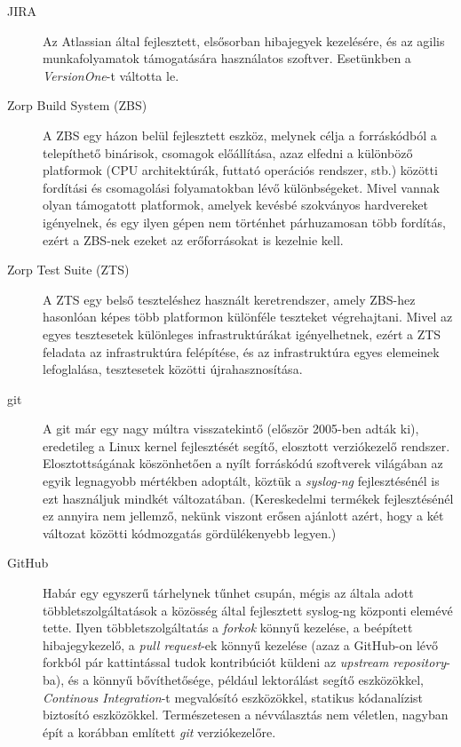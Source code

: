 \begin{description}
    \item[JIRA] {Az Atlassian által fejlesztett, elsősorban hibajegyek kezelésére, és az agilis
        munkafolyamatok támogatására használatos szoftver. Esetünkben a \emph{VersionOne}-t váltotta
        le.}
    \item[Zorp Build System (ZBS)] {A ZBS egy házon belül fejlesztett eszköz, melynek célja
        a forráskódból a telepíthető binárisok, csomagok előállítása, azaz elfedni a különböző
        platformok (CPU architektúrák, futtató operációs rendszer, stb.) közötti fordítási és
        csomagolási folyamatokban lévő különbségeket. Mivel vannak olyan támogatott platformok, amelyek
        kevésbé szokványos hardvereket igényelnek, és egy ilyen gépen nem történhet párhuzamosan több
        fordítás, ezért a ZBS-nek ezeket az erőforrásokat is kezelnie kell. }
    \item[Zorp Test Suite (ZTS)] { A ZTS egy belső teszteléshez használt keretrendszer, amely
        ZBS-hez hasonlóan képes több platformon különféle teszteket végrehajtani. Mivel az egyes
        tesztesetek különleges infrastruktúrákat igényelhetnek, ezért a ZTS feladata az
        infrastruktúra felépítése, és az infrastruktúra egyes elemeinek lefoglalása, tesztesetek
        közötti újrahasznosítása.}
    \item[git] {A git már egy nagy múltra visszatekintő (először 2005-ben adták ki), eredetileg a
        Linux kernel fejlesztését segítő, elosztott verziókezelő rendszer. Elosztottságának
        köszönhetően a nyílt forráskódú szoftverek világában az egyik legnagyobb mértékben
        adoptált, köztük a \emph{syslog-ng} fejlesztésénél is ezt használjuk mindkét változatában.
        (Kereskedelmi termékek fejlesztésénél ez annyira nem jellemző, nekünk viszont erősen
        ajánlott azért, hogy a két változat közötti kódmozgatás gördülékenyebb legyen.)}
    \item[GitHub] {Habár egy egyszerű tárhelynek tűnhet csupán, mégis az általa adott
        többletszolgáltatások a közösség által fejlesztett syslog-ng központi elemévé tette.
        Ilyen többletszolgáltatás a \emph{forkok} könnyű kezelése, a beépített hibajegykezelő,
        a \emph{pull request}-ek könnyű kezelése (azaz a GitHub-on lévő forkból pár
        kattintással tudok kontribúciót küldeni az \emph{upstream repository}-ba), és a könnyű
        bővíthetősége, például lektorálást segítő eszközökkel, \emph{Continous Integration}-t
        megvalósító eszközökkel, statikus kódanalízist biztosító eszközökkel.
        Természetesen a névválasztás nem véletlen, nagyban épít a korábban említett \emph{git}
        verziókezelőre.}
\end{description}

